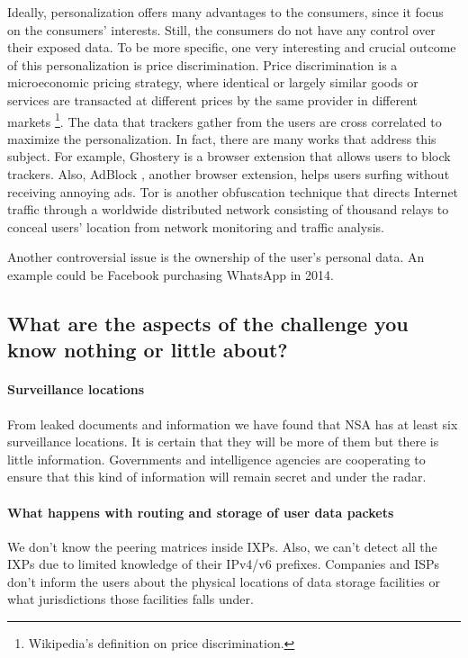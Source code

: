 Ideally, personalization offers many advantages to the consumers, since it focus
on the consumers' interests. Still, the consumers do not have any control over 
their exposed data. To be more specific, one very interesting and crucial 
outcome of this personalization is price discrimination. Price discrimination is 
a microeconomic pricing strategy, where identical or largely similar goods or 
services are transacted at different prices by the same provider in different 
markets \footnote{Wikipedia's definition on price discrimination.}.
The data that trackers gather from the users are cross correlated to maximize 
the personalization. In fact, there are many works that address this subject. 
For example, Ghostery \cite{ghostery} is a browser extension that allows users
to block trackers. Also, AdBlock \cite{adblock}, another browser extension,  
helps users surfing without receiving annoying ads. Tor \cite{syverson2004tor} 
is another obfuscation technique that directs Internet traffic through a 
worldwide distributed network consisting of thousand relays to conceal users’ 
location from network monitoring and traffic analysis. 

Another controversial issue is the ownership of the user's personal data.
An example could be Facebook purchasing WhatsApp in 2014. 

\subsection{What are the aspects of the challenge you know nothing or little 
about?}

\paragraph{Surveillance locations}
From leaked documents and information we have found that NSA has at least six 
surveillance locations. It is certain that they will be more of them but there 
is little information. Governments and intelligence agencies are cooperating to 
ensure that this kind of information will remain secret and under the radar.

\paragraph{What happens with routing and storage of user data packets}
We don't know the peering matrices inside IXPs. Also, we can't detect all the 
IXPs due to limited knowledge of their IPv4/v6 prefixes.
Companies and ISPs don't inform the users about the physical locations of data 
storage facilities or what jurisdictions those facilities falls under.

